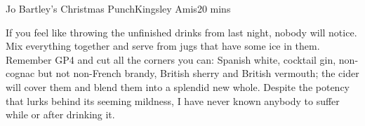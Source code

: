 \begin{recipe}{Jo Bartley's Christmas Punch}{Kingsley Amis}{20 mins}

  If you feel like throwing the unfinished drinks from last night, nobody will
  notice. Mix everything together and serve from jugs that have some ice in
  them. Remember GP4 and cut all the corners you can: Spanish white, cocktail
  gin, non-cognac but not non-French brandy, British sherry and British
  vermouth; the cider will cover them and blend them into a splendid new
  whole. Despite the potency that lurks behind its seeming mildness, I have
  never known anybody to suffer while or after drinking it.
\end{recipe}
